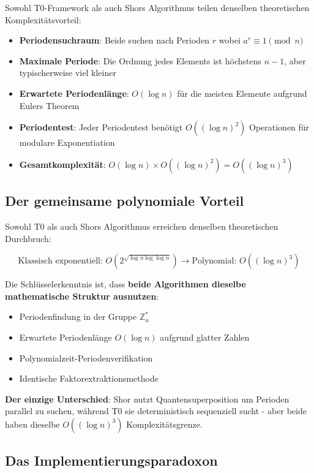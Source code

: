 \documentclass[12pt,a4paper]{article}
\begin{document}
	Sowohl T0-Framework als auch Shors Algorithmus teilen denselben theoretischen Komplexitätsvorteil:
	
	\begin{itemize}
		\item \textbf{Periodensuchraum}: Beide suchen nach Perioden $r$ wobei $a^r \equiv 1 \pmod{n}$
		\item \textbf{Maximale Periode}: Die Ordnung jedes Elements ist höchstens $n-1$, aber typischerweise viel kleiner
		\item \textbf{Erwartete Periodenlänge}: $O(\log n)$ für die meisten Elemente aufgrund Eulers Theorem
		\item \textbf{Periodentest}: Jeder Periodentest benötigt $O((\log n)^2)$ Operationen für modulare Exponentiation
		\item \textbf{Gesamtkomplexität}: $O(\log n) \times O((\log n)^2) = O((\log n)^3)$
	\end{itemize}
	
	\subsection{Der gemeinsame polynomiale Vorteil}
	
	Sowohl T0 als auch Shors Algorithmus erreichen denselben theoretischen Durchbruch:
	
	\begin{equation}
		\text{Klassisch exponentiell: } O(2^{\sqrt{\log n \log \log n}}) \rightarrow \text{Polynomial: } O((\log n)^3)
	\end{equation}
	
	Die Schlüsselerkenntnis ist, dass \textbf{beide Algorithmen dieselbe mathematische Struktur ausnutzen}:
	\begin{itemize}
		\item Periodenfindung in der Gruppe $\mathbb{Z}_n^*$
		\item Erwartete Periodenlänge $O(\log n)$ aufgrund glatter Zahlen
		\item Polynomialzeit-Periodenverifikation
		\item Identische Faktorextraktionsmethode
	\end{itemize}
	
	\textbf{Der einzige Unterschied}: Shor nutzt Quantensuperposition um Perioden parallel zu suchen, während T0 sie deterministisch sequenziell sucht - aber beide haben dieselbe $O((\log n)^3)$ Komplexitätsgrenze.
	
	\subsection{Das Implementierungsparadoxon}
	
\end{document}
